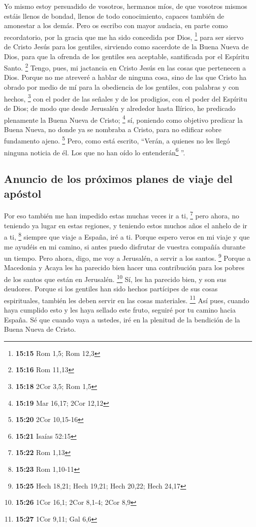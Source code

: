  Yo mismo estoy persuadido de vosotros, hermanos míos, de
que vosotros mismos estáis llenos de bondad, llenos de todo
conocimiento, capaces también de amonestar a los demás. 
Pero os escribo con mayor audacia, en parte como recordatorio, por la
gracia que me ha sido concedida por Dios, \footnote{\textbf{15:15} Rom
  1,5; Rom 12,3}  para ser siervo de Cristo Jesús para
los gentiles, sirviendo como sacerdote de la Buena Nueva de Dios, para
que la ofrenda de los gentiles sea aceptable, santificada por el
Espíritu Santo. \footnote{\textbf{15:16} Rom 11,13} 
Tengo, pues, mi jactancia en Cristo Jesús en las cosas que pertenecen a
Dios.  Porque no me atreveré a hablar de ninguna cosa,
sino de las que Cristo ha obrado por medio de mí para la obediencia de
los gentiles, con palabras y con hechos, \footnote{\textbf{15:18} 2Cor
  3,5; Rom 1,5}  con el poder de las señales y de los
prodigios, con el poder del Espíritu de Dios; de modo que desde
Jerusalén y alrededor hasta Ilírico, he predicado plenamente la Buena
Nueva de Cristo; \footnote{\textbf{15:19} Mar 16,17; 2Cor 12,12}
 sí, poniendo como objetivo predicar la Buena Nueva, no
donde ya se nombraba a Cristo, para no edificar sobre fundamento ajeno.
\footnote{\textbf{15:20} 2Cor 10,15-16}  Pero, como está
escrito, ``Verán, a quienes no les llegó ninguna noticia de él. Los que
no han oído lo entenderán\footnote{\textbf{15:21} Isaías 52:15} ''.

\hypertarget{anuncio-de-los-pruxf3ximos-planes-de-viaje-del-apuxf3stol}{%
\subsection{Anuncio de los próximos planes de viaje del
apóstol}\label{anuncio-de-los-pruxf3ximos-planes-de-viaje-del-apuxf3stol}}

 Por eso también me han impedido estas muchas veces ir a
ti, \footnote{\textbf{15:22} Rom 1,13}  pero ahora, no
teniendo ya lugar en estas regiones, y teniendo estos muchos años el
anhelo de ir a ti, \footnote{\textbf{15:23} Rom 1,10-11} 
siempre que viaje a España, iré a ti. Porque espero veros en mi viaje y
que me ayudéis en mi camino, si antes puedo disfrutar de vuestra
compañía durante un tiempo.  Pero ahora, digo, me voy a
Jerusalén, a servir a los santos. \footnote{\textbf{15:25} Hech 18,21;
  Hech 19,21; Hech 20,22; Hech 24,17}  Porque a Macedonia
y Acaya les ha parecido bien hacer una contribución para los pobres de
los santos que están en Jerusalén. \footnote{\textbf{15:26} 1Cor 16,1;
  2Cor 8,1-4; 2Cor 8,9}  Sí, les ha parecido bien, y son
sus deudores. Porque si los gentiles han sido hechos partícipes de sus
cosas espirituales, también les deben servir en las cosas materiales.
\footnote{\textbf{15:27} 1Cor 9,11; Gal 6,6}  Así pues,
cuando haya cumplido esto y les haya sellado este fruto, seguiré por tu
camino hacia España.  Sé que cuando vaya a ustedes, iré
en la plenitud de la bendición de la Buena Nueva de Cristo.

